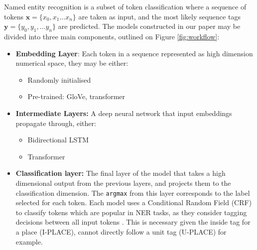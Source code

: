 \documentclass[]{interact}
\theoremstyle{plain}%
\theoremstyle{definition}
\theoremstyle{remark}
\providecommand{\tightlist}{%
  \setlength{\itemsep}{0pt}\setlength{\parskip}{0pt}}
\def\tightlist{}
\begin{document}
Named entity recognition is a subset of token classification where a
sequence of tokens \(\mathbf{x} = \{x_{0}, x_{1}\dots x_{n}\}\) are
taken as input, and the most likely sequence tags
\(\mathbf{y} = \{y_0, y_1, \dots y_n\}\) are predicted. The models
constructed in our paper may be divided into three main components,
outlined on Figure \ref{fig:workflow}:

\begin{itemize}
\tightlist
\item
  \textbf{Embedding Layer}: Each token in a sequence represented as high
  dimension numerical space, they may be either:

  \begin{itemize}
  \tightlist
  \item
    Randomly initialised
  \item
    Pre-trained: GloVe, transformer
  \end{itemize}
\item
  \textbf{Intermediate Layers:} A deep neural network that input
  embeddings propagate through, either:

  \begin{itemize}
  \tightlist
  \item
    Bidirectional LSTM
  \item
    Transformer
  \end{itemize}
\item
  \textbf{Classification layer:} The final layer of the model that takes
  a high dimensional output from the previous layers, and projects them
  to the classification dimension. The \texttt{argmax} from this layer
  corresponds to the label selected for each token. Each model uses a
  Conditional Random Field (CRF) to classify tokens which are popular in
  NER tasks, as they consider tagging decisions between all input tokens
  \citep{lample2016}. This is necessary given the inside tag for a place
  (I-PLACE), cannot directly follow a unit tag (U-PLACE) for example.
\end{itemize}
\end{document}
